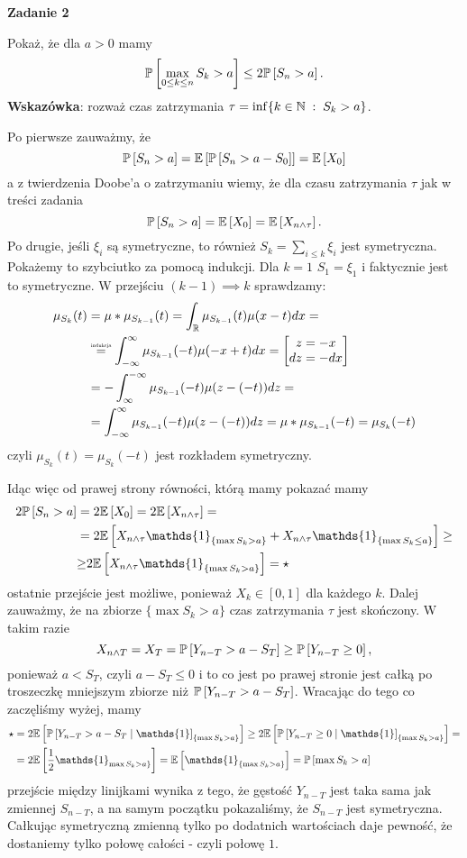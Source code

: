 \documentclass{article}
\newenvironment{zadanko}[1]{
  \bfseries{\large\color{orange}Zadanie #1}
}%
{}
\begin{document}
\begin{zadanko}{2}
  Pokaż, że dla $a>0$ mamy
  $$\prob{\max_{0\leq k\leq n}S_k>a}\leq 2\prob{S_n>a}.$$
  \textbf{Wskazówka}: rozważ czas zatrzymania $\tau=\inf\{k\in\operatorname{\mathbb{N}}\;:\;S_k>a\}$.
\end{zadanko}

Po pierwsze zauważmy, że 
$$\prob{S_n>a}=\expected{\prob{S_n>a-S_0}}=\expected{X_0}$$
a z twierdzenia Doobe'a o zatrzymaniu wiemy, że dla czasu zatrzymania $\tau$ jak w treści zadania
$$\prob{S_n>a}=\expected{X_0}=\expected{X_{n\land \tau}}.$$
Po drugie, jeśli $\xi_i$ są symetryczne, to również $S_k=\sum_{i\leq k}\xi_i$ jest symetryczna. Pokażemy to szybciutko za pomocą indukcji. Dla $k=1$ $S_1=\xi_1$ i faktycznie jest to symetryczne. W przejściu $(k-1)\implies k$ sprawdzamy:
\begin{align*}
  \mu_{S_k}(t)&=\mu\ast\mu_{S_{k-1}}(t)=\int_{\R}\mu_{S_{k-1}}(t)\mu(x-t)dx=\\ 
              &\overset{\text{\scalebox{0.55}{indukcja}}}{=}\int_{-\infty}^\infty\mu_{S_{k-1}}(-t)\mu(-x+t)dx=\begin{bmatrix}z=-x\\dz=-dx\end{bmatrix}\\ 
              &=-\int^{-\infty}_\infty\mu_{S_{k-1}}(-t)\mu(z-(-t))dz=\\
              &=\int_{-\infty}^\infty\mu_{S_{k-1}}(-t)\mu(z-(-t))dz=\mu\ast\mu_{S_{k-1}}(-t)=\mu_{S_k}(-t)
\end{align*}
czyli $\mu_{S_k}(t)=\mu_{S_k}(-t)$ jest rozkładem symetryczny.

Idąc więc od prawej strony równości, którą mamy pokazać mamy
\begin{align*}
  2\prob{S_n>a}&=2\expected{X_0}=2\expected{X_{n\land \tau}}=\\ 
               &=2\expected{X_{n\land\tau}\mathds{1}_{\{\max S_k>a\}}+X_{n\land\tau}\mathds{1}_{\{\max S_k\leq a\}}}\geq\\ 
               &{\geq}2\expected{X_{n\land\tau}\mathds{1}_{\{\max S_k>a\}}}=\star
\end{align*}
ostatnie przejście jest możliwe, ponieważ $X_k\in[0,1]$ dla każdego $k$. Dalej zauważmy, że na zbiorze $\{\max S_k>a\}$ czas zatrzymania $\tau$ jest skończony. W takim razie 
$$X_{n\land T}=X_T=\prob{Y_{n-T}>a-S_T}\geq\prob{Y_{n-T}\geq 0},$$
ponieważ $a<S_T$, czyli $a-S_T\leq 0$ i to co jest po prawej stronie jest całką po troszeczkę mniejszym zbiorze niż $\prob{Y_{n-T}>a-S_T}$. Wracając do tego co zaczęliśmy wyżej, mamy 
\begin{align*}
  \star &=2\expected{\prob{Y_{n-T}>a-S_T}\mathds{1}_{\{\max S_k>a\}}}\geq 2\expected{\prob{Y_{n-T}\geq 0}\mathds{1}_{\{\max S_k>a\}}}=\\ 
        &=2\expected{\frac{1}{2}\mathds{1}_{\max S_k>a\}}}=\expected{\mathds{1}_{\{\max S_k>a\}}}=\prob{\max S_k>a}
\end{align*}
przejście między linijkami wynika z tego, że gęstość $Y_{n-T}$ jest taka sama jak zmiennej $S_{n-T}$, a na samym początku pokazaliśmy, że $S_{n-T}$ jest symetryczna. Całkując symetryczną zmienną tylko po dodatnich wartościach daje pewność, że dostaniemy tylko połowę całości - czyli połowę $1$.
\end{document}

